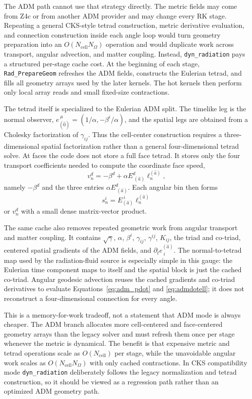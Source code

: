 \documentclass[11pt]{article}
\newcommand{\code}[1]{\texttt{#1}}
\begin{document}
The ADM path cannot use that strategy directly.  The metric fields may come
from Z4c or from another ADM provider and may change every RK stage.  Repeating
a general CKS-style tetrad construction, metric derivative evaluation, and
connection construction inside each angle loop would turn geometry preparation
into an \(O(N_{\mathrm{cell}}N_\Omega)\) operation and would duplicate work
across transport, angular advection, and matter coupling.  Instead,
\code{dyn\_radiation} pays a structured per-stage cache cost.  At the beginning
of each stage, \code{Rad\_PrepareGeom} refreshes the ADM fields, constructs the
Eulerian tetrad, and fills all geometry arrays used by the later kernels.  The
hot kernels then perform only local array reads and small fixed-size contractions.

The tetrad itself is specialized to the Eulerian ADM split.  The timelike leg is
the normal observer,
\(e_{(\hat0)}^{\ \mu}=(1/\alpha,-\beta^i/\alpha)\), and the spatial legs are
obtained from a Cholesky factorization of \(\gamma_{ij}\).  Thus the cell-center
construction requires a three-dimensional spatial factorization rather than a
general four-dimensional tetrad solve.  At faces the code does not store a full
face tetrad.  It stores only the four transport coefficients needed to compute
the coordinate face speed,
\[
  v^d_n=-\beta^d+\alpha E^d_{\ (\hat a)}\ell_n^{(\hat a)} ,
\]
namely \(-\beta^d\) and the three entries
\(\alpha E^d_{\ (\hat a)}\).  Each angular bin then forms
\begin{equation}
  s^i_n = E_{(\hat{a})}^{\ i}\ell_n^{(\hat{a})}
\end{equation}
or \(v^d_n\) with a small dense matrix-vector product.

The same cache also removes repeated geometric work from angular transport and
matter coupling.  It contains \(\sqrt{\gamma}\), \(\alpha\), \(\beta^i\),
\(\gamma_{ij}\), \(\gamma^{ij}\), \(K_{ij}\), the triad and co-triad, centered
spatial gradients of the ADM fields, and
\(\partial_t e^{(\hat a)}_{\ i}\).  The normal-to-tetrad map used by the
radiation-fluid source is especially simple in this gauge: the Eulerian time
component maps to itself and the spatial block is just the cached co-triad.
Angular geodesic advection reuses the cached gradients and co-triad derivatives
to evaluate Equations~\eqref{eq:adm_pdot} and \eqref{eq:admdotell}; it does not
reconstruct a four-dimensional connection for every angle.

This is a memory-for-work tradeoff, not a statement that ADM mode is always
cheaper.  The ADM branch allocates more cell-centered and face-centered geometry
arrays than the legacy solver and must refresh them once per stage whenever the
metric is dynamical.  The benefit is that expensive metric and tetrad operations
scale as \(O(N_{\mathrm{cell}})\) per stage, while the unavoidable angular work
scales as \(O(N_{\mathrm{cell}}N_\Omega)\) with only cached contractions.  In
CKS compatibility mode \code{dyn\_radiation} deliberately follows the legacy
normalization and tetrad construction, so it should be viewed as a regression
path rather than an optimized ADM geometry path.
\end{document}
